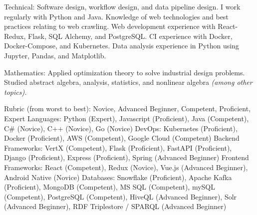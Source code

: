 \documentclass[10pt,a4paper]{article} %
\begin{document}

\inlineheadsection %
{Technical:}
{Software design, workflow design, and data pipeline design. I work regularly with Python and Java. Knowledge of web technologies and best practices relating to web crawling. Web development experience with React-Redux, Flask, SQL Alchemy, and PostgreSQL. CI experience with Docker, Docker-Compose, and Kubernetes. Data analysis experience in Python using Jupyter, Pandas, and Matplotlib.}


\inlineheadsection %
{Mathematics:}
{Applied optimization theory to solve industrial design problems. Studied abstract algebra, analysis, statistics, and nonlinear algebra \textit{(among other topics).}}


Rubric (from worst to best): Novice, Advanced Beginner, Competent, Proficient, Expert
\inlineheadsection %
{Languages:}
{Python (Expert), Javascript (Proficient), Java (Competent), C\# (Novice), C++ (Novice), Go (Novice)}
\inlineheadsection %
{DevOps:}
{Kubernetes (Proficient), Docker (Proficient), AWS (Competent), Google Cloud (Competent)}
\inlineheadsection %
{Backend Frameworks:}
{VertX (Competent), Flask (Proficient), FastAPI (Proficient), Django (Proficient), Express (Proficient), Spring (Advanced Beginner)}
\inlineheadsection %
{Frontend Frameworks:}
{React (Competent), Redux (Novice), Vue.js (Advanced Beginner), Android Native (Novice)}
\inlineheadsection %
{Databases:}
{Snowflake (Proficient), Apache Kafka (Proficient), MongoDB (Competent), MS SQL (Competent), mySQL (Competent), PostgreSQL (Competent), HiveQL (Advanced Beginner), Solr (Advanced Beginner), RDF Triplestore / SPARQL (Advanced Beginner)}

\spacedhrule{1.6em}{-0.4em} %

\end{document}
